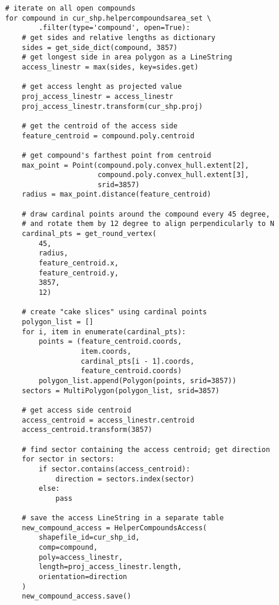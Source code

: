     \begin{lstlisting}
    # iterate on all open compounds
    for compound in cur_shp.helpercompoundsarea_set \
            .filter(type='compound', open=True):
        # get sides and relative lengths as dictionary
        sides = get_side_dict(compound, 3857)
        # get longest side in area polygon as a LineString
        access_linestr = max(sides, key=sides.get)

        # get access lenght as projected value
        proj_access_linestr = access_linestr
        proj_access_linestr.transform(cur_shp.proj)

        # get the centroid of the access side
        feature_centroid = compound.poly.centroid

        # get compound's farthest point from centroid
        max_point = Point(compound.poly.convex_hull.extent[2],
                          compound.poly.convex_hull.extent[3],
                          srid=3857)
        radius = max_point.distance(feature_centroid)

        # draw cardinal points around the compound every 45 degree,
        # and rotate them by 12 degree to align perpendicularly to N
        cardinal_pts = get_round_vertex(
            45,
            radius,
            feature_centroid.x,
            feature_centroid.y,
            3857,
            12)

        # create "cake slices" using cardinal points
        polygon_list = []
        for i, item in enumerate(cardinal_pts):
            points = (feature_centroid.coords,
                      item.coords,
                      cardinal_pts[i - 1].coords,
                      feature_centroid.coords)
            polygon_list.append(Polygon(points, srid=3857))
        sectors = MultiPolygon(polygon_list, srid=3857)

        # get access side centroid
        access_centroid = access_linestr.centroid
        access_centroid.transform(3857)

        # find sector containing the access centroid; get direction
        for sector in sectors:
            if sector.contains(access_centroid):
                direction = sectors.index(sector)
            else:
                pass

        # save the access LineString in a separate table
        new_compound_access = HelperCompoundsAccess(
            shapefile_id=cur_shp_id,
            comp=compound,
            poly=access_linestr,
            length=proj_access_linestr.length,
            orientation=direction
        )
        new_compound_access.save()
    \end{lstlisting}

